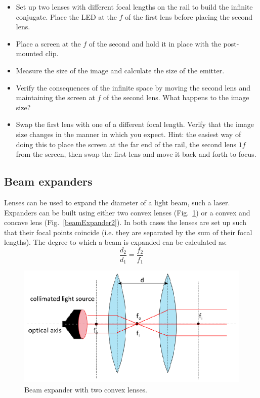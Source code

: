 \documentclass[a4paper]{report}
\begin{document}
\begin{itemize}
\item Set up two lenses with different focal lengths on the rail to build the infinite conjugate. 
Place the LED at the $f$ of the first lens before placing the second lens. 
\item Place a screen at the $f$ of the second and hold it in place with the post-mounted clip.
\item Measure the size of the image and calculate the size of the emitter. 
\item Verify the consequences of the infinite space by moving the second lens and maintaining the screen at $f$ of the second lens. 
What happens to the image size?
\item Swap the first lens with one of a different focal length. 
Verify that the image size changes in the manner in which you expect.
Hint: the easiest way of doing this to place the screen at the far end of the rail, the second lens $1f$ from the screen, then swap the first lens and move it back and forth to focus. 
\end{itemize}


\subsection{Beam expanders}
Lenses can be used to expand the diameter of a light beam, such a laser.
Expanders can be built using either two convex lenses (Fig.~\ref{beamExpander1}) or a convex and concave lens (Fig.~\ref{beamExpander2}). 
In both cases the lenses are set up such that their focal points coincide (i.e. they are separated by the sum of their focal lengths). 
The degree to which a beam is expanded can be calculated as:
\begin{equation}
\frac{d_2}{d_1}=\frac{f_2}{f_1}
\label{eq:beamExp}
\end{equation}

\begin{figure}[h]
\center
\includegraphics[width=4.5in]{beamExpander1.eps}
\caption{Beam expander with two convex lenses.}
\label{beamExpander1}
\end{figure}
\end{document}
